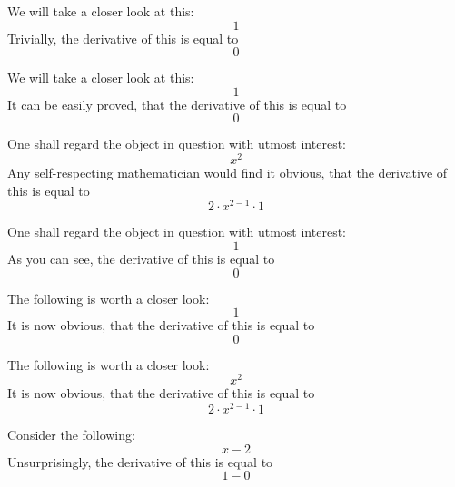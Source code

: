 \documentclass{article}
\begin{document}
We will take a closer look at this:
\begin{equation}
1 
\end{equation}
Trivially, the derivative of this is equal to
\begin{equation}
0 
\end{equation}

We will take a closer look at this:
\begin{equation}
1 
\end{equation}
It can be easily proved, that the derivative of this is equal to
\begin{equation}
0 
\end{equation}

One shall regard the object in question with utmost interest:
\begin{equation}
x ^{2 } 
\end{equation}
Any self-respecting mathematician would find it obvious, that the derivative of this is equal to
\begin{equation}
2 \cdot x ^{2 - 1 } \cdot 1 
\end{equation}

One shall regard the object in question with utmost interest:
\begin{equation}
1 
\end{equation}
As you can see, the derivative of this is equal to
\begin{equation}
0 
\end{equation}

The following is worth a closer look:
\begin{equation}
1 
\end{equation}
It is now obvious, that the derivative of this is equal to
\begin{equation}
0 
\end{equation}

The following is worth a closer look:
\begin{equation}
x ^{2 } 
\end{equation}
It is now obvious, that the derivative of this is equal to
\begin{equation}
2 \cdot x ^{2 - 1 } \cdot 1 
\end{equation}

Consider the following:
\begin{equation}
x - 2 
\end{equation}
Unsurprisingly, the derivative of this is equal to
\begin{equation}
1 - 0 
\end{equation}
\end{document}
